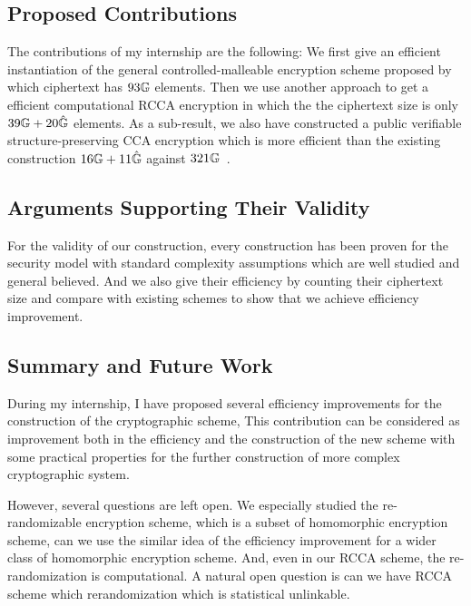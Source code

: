 \subsection*{Proposed Contributions}
The contributions of my internship are the following:
We first give an efficient instantiation of the general controlled-malleable encryption scheme proposed by~\cite{DBLP:conf/eurocrypt/ChaseKLM12} which ciphertext has $93\mathbb{G}$ elements.
Then we use another approach to get a efficient computational RCCA encryption in which the the ciphertext size is only $39\mathbb{G} + 20 \hat{\mathbb{G}}$ elements.
As a sub-result, we also have constructed a public verifiable structure-preserving CCA encryption which is more efficient than the existing construction $16\mathbb{G} + 11\hat{\mathbb{G}}$ against $321\mathbb{G}$~\cite{DBLP:conf/pkc/AbeDKNO13}.

\subsection*{Arguments Supporting Their Validity}
For the validity of our construction,
every construction has been proven for the security model with standard complexity assumptions which are well studied and general believed.
And we also give their efficiency by counting their ciphertext size and compare with existing schemes to show that we achieve efficiency improvement.

\subsection*{Summary and Future Work}
During my internship, I have proposed several efficiency improvements for the construction of the cryptographic scheme,
This contribution can be considered as improvement both in the efficiency and the construction of the new scheme with some practical properties for the further construction of more complex cryptographic system.

However, several questions are left open. 
We especially studied the re-randomizable encryption scheme, which is a subset of homomorphic encryption scheme,
can we use the similar idea of the efficiency improvement for a wider class of homomorphic encryption scheme.
And, even in our RCCA scheme, the re-randomization is computational.
A natural open question is can we have RCCA scheme which rerandomization which is statistical unlinkable.

